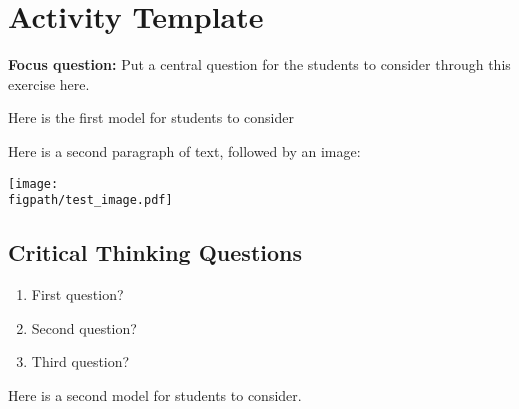 %
%
%
%

\section{Activity Template}
\renewcommand{\figpath}{content}

\textbf{Focus question:} Put a central question for the students to consider through this exercise here.

\begin{model}[ABC]

	Here is the first model for students to consider

	Here is a second paragraph of text, followed by an image:

	\centerline{\texttt{[image: \\figpath/test\_image.pdf]}}

\end{model}

\subsection*{Critical Thinking Questions}

	\begin{enumerate}
		\item First question?
		
			\answerspace{1in}
			
		\item Second question?
		
			\answerspace{1in}
			
		\item Third question?
		
			\answerspace{1in}
			
	\end{enumerate}

\begin{model}[DEF]

	Here is a second model for students to consider.

\end{model}

